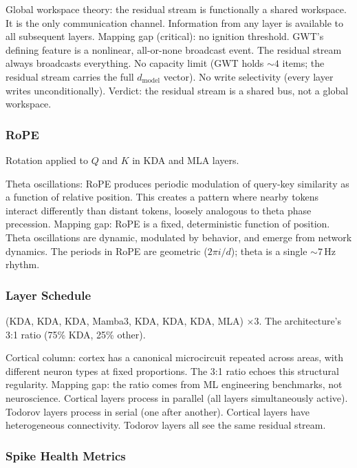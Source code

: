 \documentclass[11pt,a4paper]{article}
\begin{document}
Global workspace theory: the residual stream is functionally a shared workspace. It is the only communication channel. Information from any layer is available to all subsequent layers. Mapping gap (critical): no ignition threshold. GWT's defining feature is a nonlinear, all-or-none broadcast event. The residual stream always broadcasts everything. No capacity limit (GWT holds ${\sim}4$ items; the residual stream carries the full $d_{\mathrm{model}}$ vector). No write selectivity (every layer writes unconditionally). Verdict: the residual stream is a shared bus, not a global workspace.

\subsubsection{RoPE}

Rotation applied to $Q$ and $K$ in KDA and MLA layers.

Theta oscillations: RoPE produces periodic modulation of query-key similarity as a function of relative position. This creates a pattern where nearby tokens interact differently than distant tokens, loosely analogous to theta phase precession. Mapping gap: RoPE is a fixed, deterministic function of position. Theta oscillations are dynamic, modulated by behavior, and emerge from network dynamics. The periods in RoPE are geometric ($2\pi i / d$); theta is a single ${\sim}7$\,Hz rhythm.

\subsubsection{Layer Schedule}

(KDA, KDA, KDA, Mamba3, KDA, KDA, KDA, MLA) $\times 3$. The architecture's 3:1 ratio (75\% KDA, 25\% other).

Cortical column: cortex has a canonical microcircuit repeated across areas, with different neuron types at fixed proportions. The 3:1 ratio echoes this structural regularity. Mapping gap: the ratio comes from ML engineering benchmarks, not neuroscience. Cortical layers process in parallel (all layers simultaneously active). Todorov layers process in serial (one after another). Cortical layers have heterogeneous connectivity. Todorov layers all see the same residual stream.

\subsubsection{Spike Health Metrics}
\end{document}
